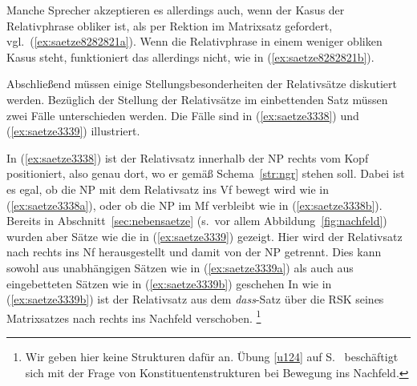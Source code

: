 Manche Sprecher akzeptieren es allerdings auch, wenn der Kasus der Relativphrase obliker ist, als per Rektion im Matrixsatz gefordert, vgl.\ (\ref{ex:saetze8282821a}).
Wenn die Relativphrase in einem weniger obliken Kasus steht, funktioniert das allerdings nicht, wie in (\ref{ex:saetze8282821b}).

\begin{exe}
  \ex\label{ex:saetze8282821} 
  \begin{xlist}
  \end{xlist}
\end{exe}

Abschließend müssen einige Stellungsbesonderheiten der Relativsätze diskutiert werden. 
Bezüglich der Stellung der Relativsätze im einbettenden Satz müssen zwei Fälle unterschieden werden.
Die Fälle sind in (\ref{ex:saetze3338}) und (\ref{ex:saetze3339}) illustriert.

\begin{exe}
  \ex\label{ex:saetze3338}
  \begin{xlist}
  \end{xlist}
  \ex\label{ex:saetze3339}
  \begin{xlist}
  \end{xlist}
\end{exe}

In (\ref{ex:saetze3338}) ist der Relativsatz innerhalb der NP rechts vom Kopf positioniert, also genau dort, wo er gemäß Schema~\ref{str:ngr} stehen soll.
Dabei ist es egal, ob die NP mit dem Relativsatz ins Vf bewegt wird wie in (\ref{ex:saetze3338a}), oder ob die NP im Mf verbleibt wie in (\ref{ex:saetze3338b}).
Bereits in Abschnitt~\ref{sec:nebensaetze} (s.\ vor allem Abbildung~\ref{fig:nachfeld}) wurden aber Sätze wie die in (\ref{ex:saetze3339}) gezeigt.
Hier wird der Relativsatz nach rechts ins Nf herausgestellt und damit von der NP getrennt.
Dies kann sowohl aus unabhängigen Sätzen wie in (\ref{ex:saetze3339a}) als auch aus eingebetteten Sätzen wie in (\ref{ex:saetze3339b}) geschehen
In wie in (\ref{ex:saetze3339b}) ist der Relativsatz aus dem \textit{dass}-Satz über die RSK seines Matrixsatzes nach rechts ins Nachfeld verschoben.%
\footnote{Wir geben hier keine Strukturen dafür an.
Übung \ref{u124} auf S.~\pageref{u124} beschäftigt sich mit der Frage von Konstituentenstrukturen bei Bewegung ins Nachfeld.}

